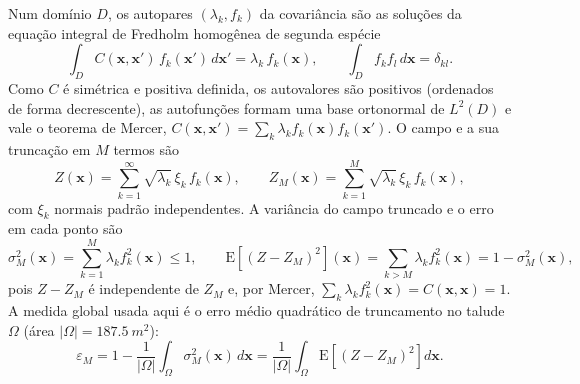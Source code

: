 Num domínio $D$, os autopares $(\lambda_k, f_k)$ da covariância são as soluções da equação integral de Fredholm
homogênea de segunda espécie
\begin{equation}
  \int_D C(\mathbf{x}, \mathbf{x}') \, f_k(\mathbf{x}') \, d\mathbf{x}' = \lambda_k \, f_k(\mathbf{x}),
  \qquad \int_D f_k f_l \, d\mathbf{x} = \delta_{kl}.
  \label{eq:kl:fredholm}
\end{equation}
Como $C$ é simétrica e positiva definida, os autovalores são positivos (ordenados de forma decrescente), as autofunções
formam uma base ortonormal de $L^2(D)$ e vale o teorema de Mercer,
$C(\mathbf{x}, \mathbf{x}') = \sum_k \lambda_k f_k(\mathbf{x}) f_k(\mathbf{x}')$. O campo e a sua truncação em $M$ termos são
\begin{equation}
  Z(\mathbf{x}) = \sum_{k=1}^{\infty} \sqrt{\lambda_k} \, \xi_k \, f_k(\mathbf{x}),
  \qquad
  Z_M(\mathbf{x}) = \sum_{k=1}^{M} \sqrt{\lambda_k} \, \xi_k \, f_k(\mathbf{x}),
  \label{eq:kl:expansao}
\end{equation}
com $\xi_k$ normais padrão independentes. A variância do campo truncado e o erro em cada ponto são
\begin{equation}
  \sigma_M^2(\mathbf{x}) = \sum_{k=1}^{M} \lambda_k f_k^2(\mathbf{x}) \le 1,
  \qquad
  \mathrm{E}\left[(Z - Z_M)^2\right](\mathbf{x}) = \sum_{k > M} \lambda_k f_k^2(\mathbf{x}) = 1 - \sigma_M^2(\mathbf{x}),
  \label{eq:kl:variancia}
\end{equation}
pois $Z - Z_M$ é independente de $Z_M$ e, por Mercer, $\sum_k \lambda_k f_k^2(\mathbf{x}) = C(\mathbf{x}, \mathbf{x}) = 1$.
A medida global usada aqui é o erro médio quadrático de truncamento no talude $\Omega$ (área
$|\Omega| = \SI{187.5}{m^2}$):
\begin{equation}
  \varepsilon_M = 1 - \frac{1}{|\Omega|} \int_{\Omega} \sigma_M^2(\mathbf{x}) \, d\mathbf{x}
  = \frac{1}{|\Omega|} \int_{\Omega} \mathrm{E}\left[(Z - Z_M)^2\right] d\mathbf{x}.
  \label{eq:kl:erro}
\end{equation}
